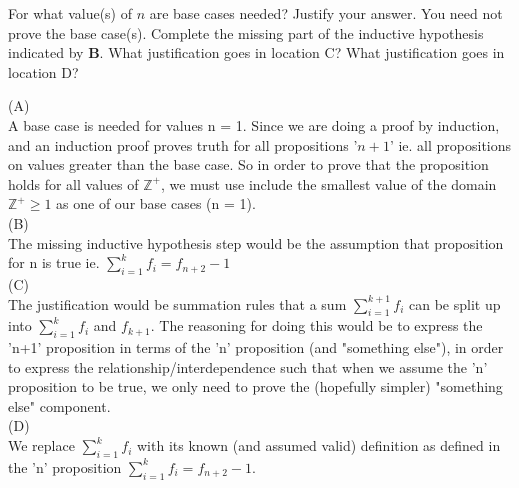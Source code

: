 \documentclass[solution,letterpaper]{cs20}
\begin{document}
\begin{problem}
        \subproblem For what value(s) of $n$ are base cases needed? Justify your answer. You need not prove the base case(s).
        \subproblem Complete the missing part of the inductive hypothesis indicated by \textbf{B}.
        \subproblem What justification goes in location C?
        \subproblem What justification goes in location D?
        \begin{solution}
        (A) \\
        A base case is needed for values n = 1. Since we are doing a proof by induction, and an induction proof proves truth for all  propositions '$n+1$' ie. all propositions on values greater than the base case. So in order to prove that the proposition holds for all values of $\mathbb{Z}^+$, we must use include the smallest value of the domain $\mathbb{Z}^+ \geq 1$ as one of our base cases (n = 1). \\
        (B) \\
        The missing inductive hypothesis step would be the assumption that proposition for n is true ie. $\sum\limits^{k}_{i=1} f_i = f_{n+2} - 1$ \\
        (C) \\
        The justification would be summation rules that a sum $\sum\limits^{k+1}_{i=1} f_i$ can be split up into $\sum\limits_{i = 1}^{k} f_i$ and $f_{k+1}$. The reasoning for doing this would be to express the 'n+1' proposition in terms of the 'n' proposition (and "something else"), in order to express the relationship/interdependence such that when we assume the 'n' proposition to be true, we only need to prove the (hopefully simpler) "something else" component. \\
        (D) \\
        We replace $\sum\limits_{i = 1}^{k} f_i$ with its known (and assumed valid) definition as defined in the 'n' proposition $\sum_{i=1}^{k} f_i = f_{n+2} - 1$.
        \end{solution}
    \end{problem}

    \newpage
\end{document}
